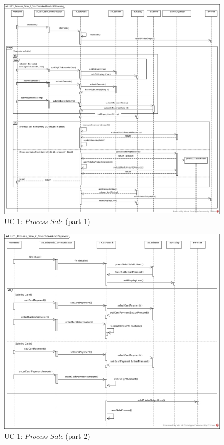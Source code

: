 		
			\begin{figure}[!h]
				\centering
				\includegraphics[width = 1\textwidth]{img/UC1_Process_Sale_1_StartSaleAndProductChoosing.jpg}
				\caption{UC 1: \textit{Process Sale} (part 1)}
				\label{MS_UC1_1}
			\end{figure}
			
			\begin{figure}[!h]
				\centering
				\includegraphics[width = 1\textwidth]{img/UC1_Process_Sale_2_FinishSaleAndPayment.jpg}
				\caption{UC 1: \textit{Process Sale} (part 2)}
				\label{MS_UC1_2}
			\end{figure}
			
